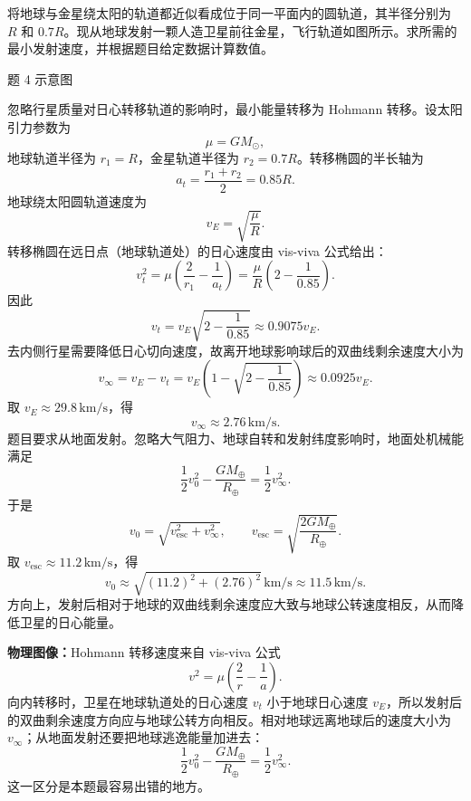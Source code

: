 \begin{question}[去金星的最小发射速度]
将地球与金星绕太阳的轨道都近似看成位于同一平面内的圆轨道，其半径分别为 $R$ 和 $0.7R$。现从地球发射一颗人造卫星前往金星，飞行轨道如图所示。求所需的最小发射速度，并根据题目给定数据计算数值。

\begin{center}

{\small 题 4 示意图}
\end{center}

\begin{solution}
忽略行星质量对日心转移轨道的影响时，最小能量转移为 Hohmann 转移。设太阳引力参数为
\[
  \mu=GM_\odot,
\]
地球轨道半径为 $r_1=R$，金星轨道半径为 $r_2=0.7R$。转移椭圆的半长轴为
\[
  a_t=\frac{r_1+r_2}{2}=0.85R.
\]
地球绕太阳圆轨道速度为
\[
  v_E=\sqrt{\frac{\mu}{R}}.
\]
转移椭圆在远日点（地球轨道处）的日心速度由 vis-viva 公式给出：
\[
  v_t^2=\mu\left(\frac{2}{r_1}-\frac1{a_t}\right)
  =\frac{\mu}{R}\left(2-\frac{1}{0.85}\right).
\]
因此
\[
  v_t=v_E\sqrt{2-\frac{1}{0.85}}
  \approx 0.9075v_E.
\]
去内侧行星需要降低日心切向速度，故离开地球影响球后的双曲线剩余速度大小为
\[
  v_\infty=v_E-v_t
  =v_E\left(1-\sqrt{2-\frac{1}{0.85}}\right)
  \approx0.0925v_E.
\]
取 $v_E\approx29.8\,\mathrm{km/s}$，得
\[
  v_\infty\approx2.76\,\mathrm{km/s}.
\]
题目要求从地面发射。忽略大气阻力、地球自转和发射纬度影响时，地面处机械能满足
\[
  \frac12v_0^2-\frac{GM_\oplus}{R_\oplus}=\frac12v_\infty^2.
\]
于是
\[
  v_0=\sqrt{v_{\mathrm{esc}}^2+v_\infty^2},
  \qquad
  v_{\mathrm{esc}}=\sqrt{\frac{2GM_\oplus}{R_\oplus}}.
\]
取 $v_{\mathrm{esc}}\approx11.2\,\mathrm{km/s}$，得
\[
  \boxed{v_0\approx\sqrt{(11.2)^2+(2.76)^2}\,\mathrm{km/s}
  \approx11.5\,\mathrm{km/s}.}
\]
方向上，发射后相对于地球的双曲线剩余速度应大致与地球公转速度相反，从而降低卫星的日心能量。


\medskip
\textbf{物理图像：}Hohmann 转移速度来自 vis-viva 公式
\[
  v^2=\mu\left(\frac2r-\frac1a\right).
\]
向内转移时，卫星在地球轨道处的日心速度 $v_t$ 小于地球日心速度 $v_E$，所以发射后的双曲剩余速度方向应与地球公转方向相反。相对地球远离地球后的速度大小为 $v_\infty$；从地面发射还要把地球逃逸能量加进去：
\[
  \frac12v_0^2-\frac{GM_\oplus}{R_\oplus}=\frac12v_\infty^2.
\]
这一区分是本题最容易出错的地方。
\end{solution}
\end{question}

